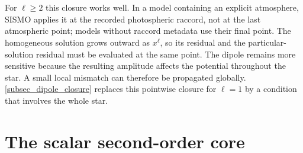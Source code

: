 \documentclass[]{aa}
\begin{document}
\\~\\For $\ell\ge2$ this closure works well.  In a model containing an explicit atmosphere, SISMO applies it at the recorded photospheric raccord, not at the last atmospheric point; models without raccord metadata use their final point.  The homogeneous solution grows outward as $x^{\ell}$, so its residual and the particular-solution residual must be evaluated at the same point.  The dipole remains more sensitive because the resulting amplitude affects the potential throughout the star.  A small local mismatch can therefore be propagated globally.  \autoref{subsec_dipole_closure} replaces this pointwise closure for $\ell=1$ by a condition that involves the whole star.

\section{The scalar second-order core}
\label{sec:core}
\end{document}
